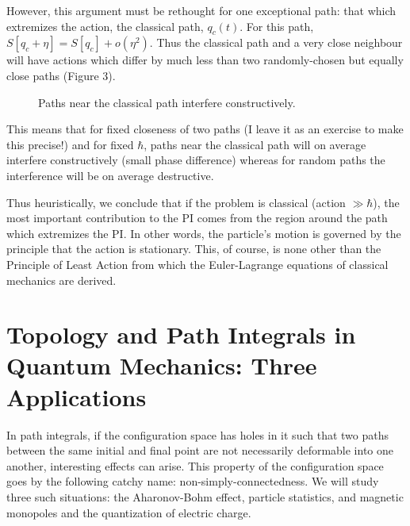 \documentclass[12pt]{article}
\begin{document}
However, this argument must be rethought for one exceptional path: that
which extremizes the action, \ie the classical path, $q_c(t)$. 
For this path, $S[q_c+\eta]=S[q_c]+o(\eta^2)$. Thus the classical path
and a very close neighbour will have actions which differ by much less
than two randomly-chosen but equally close paths (Figure 3).
\begin{figure}[hb]
\epsfysize=5cm
\centerline{}
\caption{Paths near the classical path interfere constructively.}
\end{figure}
This means that for fixed closeness of two paths (I leave it as an
exercise to make this precise!) and for fixed $\hbar$, paths near the
classical path will on average interfere constructively (small phase
difference) whereas for random paths the interference will be on
average destructive.

Thus heuristically, we conclude that if the problem is classical
(action $\gg\hbar$), the most important contribution to the PI comes
from the region around the path which extremizes the PI. In other
words, the particle's motion is governed by the principle that the
action is stationary. This, of course, is none other than the
Principle of Least Action from which the Euler-Lagrange equations of
classical mechanics are derived.



\section[Topology and Path Integrals]
{Topology and Path Integrals in Quantum Mechanics: Three Applications}

In path integrals, if the configuration space has holes in it such
that two paths between the same initial and final point are
not necessarily deformable into one another, interesting effects can
arise. This property of the configuration space goes by the following
catchy name: non-sim\-ply-con\-nec\-ted\-ness. We will study three
such situations: the Aharonov-Bohm effect, particle statistics, and
magnetic monopoles and the quantization of electric charge.
\end{document}

